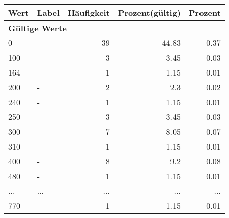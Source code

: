      \begin{longtable}{lXrrr}
     \toprule
     \textbf{Wert} & \textbf{Label} & \textbf{Häufigkeit} & \textbf{Prozent(gültig)} & \textbf{Prozent} \\
     \endhead
     \midrule
     \multicolumn{5}{l}{\textbf{Gültige Werte}}\\
        0 & \multicolumn{1}{X}{-} & %
          \num{39} &
          \num[round-mode=places,round-precision=2]{44.83} &
          \num[round-mode=places,round-precision=2]{0.37} \\
        100 & \multicolumn{1}{X}{-} & %
          \num{3} &
          \num[round-mode=places,round-precision=2]{3.45} &
          \num[round-mode=places,round-precision=2]{0.03} \\
        164 & \multicolumn{1}{X}{-} & %
          \num{1} &
          \num[round-mode=places,round-precision=2]{1.15} &
          \num[round-mode=places,round-precision=2]{0.01} \\
        200 & \multicolumn{1}{X}{-} & %
          \num{2} &
          \num[round-mode=places,round-precision=2]{2.3} &
          \num[round-mode=places,round-precision=2]{0.02} \\
        240 & \multicolumn{1}{X}{-} & %
          \num{1} &
          \num[round-mode=places,round-precision=2]{1.15} &
          \num[round-mode=places,round-precision=2]{0.01} \\
        250 & \multicolumn{1}{X}{-} & %
          \num{3} &
          \num[round-mode=places,round-precision=2]{3.45} &
          \num[round-mode=places,round-precision=2]{0.03} \\
        300 & \multicolumn{1}{X}{-} & %
          \num{7} &
          \num[round-mode=places,round-precision=2]{8.05} &
          \num[round-mode=places,round-precision=2]{0.07} \\
        310 & \multicolumn{1}{X}{-} & %
          \num{1} &
          \num[round-mode=places,round-precision=2]{1.15} &
          \num[round-mode=places,round-precision=2]{0.01} \\
        400 & \multicolumn{1}{X}{-} & %
          \num{8} &
          \num[round-mode=places,round-precision=2]{9.2} &
          \num[round-mode=places,round-precision=2]{0.08} \\
        480 & \multicolumn{1}{X}{-} & %
          \num{1} &
          \num[round-mode=places,round-precision=2]{1.15} &
          \num[round-mode=places,round-precision=2]{0.01} \\
       ... & ... & ... & ... & ... \\
        770 & \multicolumn{1}{X}{-} & %
          \num{1} &
          \num[round-mode=places,round-precision=2]{1.15} &
          \num[round-mode=places,round-precision=2]{0.01} \\


\end{longtable}
